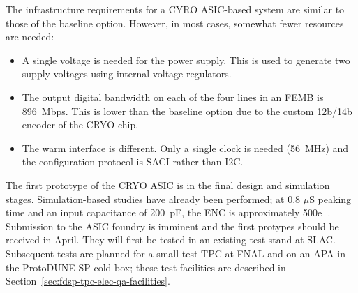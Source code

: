 The infrastructure requirements for a CYRO ASIC-based system are similar to those of the baseline option. However, in most cases, somewhat fewer resources are needed:
\begin{itemize}
\item{A single voltage is needed for the power supply. This is used to generate two supply voltages using internal voltage regulators.}
\item{The output digital bandwidth on each of the four lines in an FEMB is 896~Mbps. This is lower than the baseline option due to the custom 12b/14b encoder of the CRYO chip. }
\item{The warm interface is different. Only a single clock is needed (56~MHz) and the configuration protocol is SACI rather than I2C. }
\end{itemize}

The first prototype of the CRYO ASIC is in the final design and simulation stages. Simulation-based studies have already been performed; at 0.8 $\mu$S peaking time and an input capacitance of 200~pF, the ENC is approximately 500e$^-$.  Submission to the ASIC foundry is imminent and the first protypes should be received in April. They will first be tested in an existing test stand at SLAC. Subsequent tests are planned for a small test TPC at FNAL and on an APA in the ProtoDUNE-SP cold box; these test facilities are described in Section~\ref{sec:fdsp-tpc-elec-qa-facilities}.
